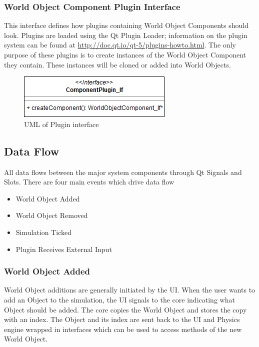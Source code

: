   \subsubsection*{World Object Component Plugin Interface}
  This interface defines how plugins containing World Object Components should look. Plugins are loaded using the Qt Plugin Loader; information on the plugin system can be found at \href{http://doc.qt.io/qt-5/plugins-howto.html#the-low-level-api-extending-qt-applications}{http://doc.qt.io/qt-5/plugins-howto.html}. 
  The only purpose of these plugins is to create instances of the World Object Component they contain. These instances will be cloned or added into World Objects.
 \begin{figure}[h]
 	\begin{center}
 	\includegraphics[scale=0.5]{./images_design/uml/ComponentPlugin}
 	\caption{UML of Plugin interface\label{uml:componentplugin}}
 	\end{center}
 \end{figure} 
 
 \subsection{Data Flow}
 All data flows between the major system components through Qt Signals and Slots. There are four main events which drive data flow
 \begin{itemize}
 	\item World Object Added
 	\item World Object Removed
 	\item Simulation Ticked
 	\item Plugin Receives External Input
 \end{itemize}
 
 \subsubsection*{World Object Added}
 	World Object additions are generally initiated by the UI. When the user wants to add an Object to the simulation, the UI signals to the core indicating what Object should be added. The core copies the World Object and stores the copy with an index. The Object and its index are sent back to the UI and Physics engine wrapped in interfaces which can be used to access methods of the new World Object.
 	
